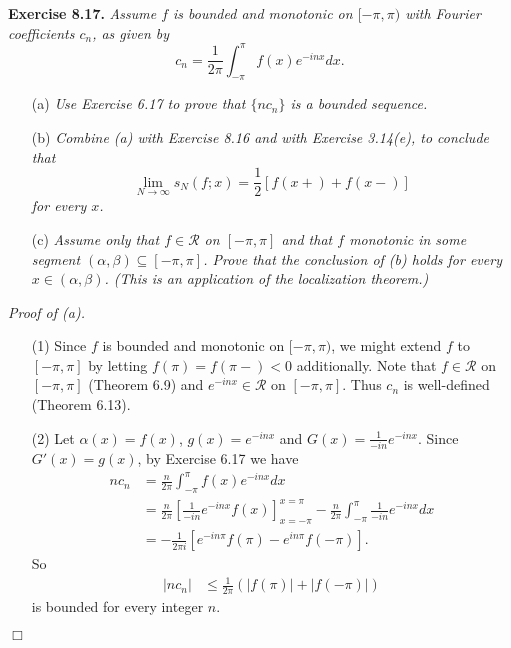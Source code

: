\documentclass{article}
\begin{document}



\textbf{Exercise 8.17.}
\emph{Assume $f$ is bounded and monotonic on $[-\pi,\pi)$
with Fourier coefficients $c_n$,
as given by
\[
  c_n = \frac{1}{2\pi}\int_{-\pi}^{\pi} f(x)e^{-inx} dx.
\]}
\begin{enumerate}
\item[(a)]
\emph{Use Exercise 6.17 to prove that $\{nc_n\}$ is a bounded sequence.}
\item[(b)]
\emph{Combine (a) with Exercise 8.16 and with Exercise 3.14(e),
to conclude that
\[
  \lim_{N \to \infty} s_N(f;x) = \frac{1}{2}[f(x+)+f(x-)]
\]
for every $x$.}
\item[(c)]
\emph{Assume only that $f \in \mathscr{R}$ on $[-\pi,\pi]$ and
that $f$ monotonic in some segment $(\alpha,\beta) \subseteq [-\pi,\pi]$.
Prove that the conclusion of (b) holds for every $x \in (\alpha,\beta)$.
(This is an application of the localization theorem.)} \\
\end{enumerate}

\emph{Proof of (a).}
\begin{enumerate}
\item[(1)]
  Since $f$ is bounded and monotonic on $[-\pi,\pi)$,
  we might extend $f$ to $[-\pi,\pi]$ by letting $f(\pi) = f(\pi-) < 0$ additionally.
  Note that $f \in \mathscr{R}$ on $[-\pi,\pi]$ (Theorem 6.9)
  and $e^{-inx} \in \mathscr{R}$ on $[-\pi,\pi]$.
  Thus $c_n$ is well-defined (Theorem 6.13).

\item[(2)]
  Let $\alpha(x) = f(x)$, $g(x) = e^{-inx}$ and $G(x) = \frac{1}{-in}e^{-inx}$.
  Since $G'(x) = g(x)$, by Exercise 6.17 we have
  \begin{align*}
    nc_n
    &= \frac{n}{2\pi} \int_{-\pi}^{\pi} f(x)e^{-inx} dx \\
    &= \frac{n}{2\pi} \left[ \frac{1}{-in}e^{-inx}f(x) \right]_{x=-\pi}^{x=\pi}
      - \frac{n}{2\pi} \int_{-\pi}^{\pi} \frac{1}{-in}e^{-inx} dx \\
    &= -\frac{1}{2\pi i} \left[ e^{-in\pi}f(\pi) - e^{in\pi}f(-\pi) \right].
  \end{align*}
  So
  \begin{align*}
    |nc_n|
    &\leq \frac{1}{2\pi} (|f(\pi)| + |f(-\pi)|)
  \end{align*}
  is bounded for every integer $n$.
\end{enumerate}
$\Box$ \\
\end{document}

